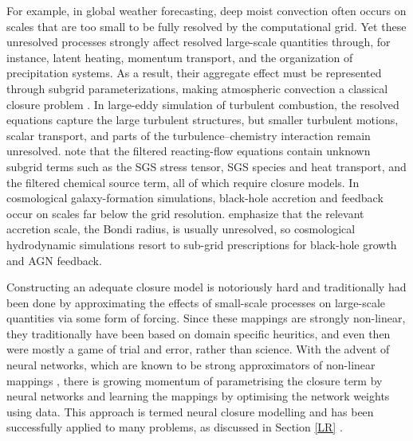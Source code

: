 For example, in global weather forecasting, deep moist convection often occurs on scales that are too small to be fully resolved by the computational grid. Yet these unresolved processes strongly affect resolved large-scale quantities through, for instance, latent heating, momentum transport, and the organization of precipitation systems. As a result, their aggregate effect must be represented through subgrid parameterizations, making atmospheric convection a classical closure problem \cite{wedi2020baseline}. In large-eddy simulation of turbulent combustion, the resolved equations capture the large turbulent structures, but smaller turbulent motions, scalar transport, and parts of the turbulence–chemistry interaction remain unresolved. \citet{janicka2005large} note that the filtered reacting-flow equations contain unknown subgrid terms such as the SGS stress tensor, SGS species and heat transport, and the filtered chemical source term, all of which require closure models. In cosmological galaxy-formation simulations, black-hole accretion and feedback occur on scales far below the grid resolution. \citet{negri2017black} emphasize that the relevant accretion scale, the Bondi radius, is usually unresolved, so cosmological hydrodynamic simulations resort to sub-grid prescriptions for black-hole growth and AGN feedback.

Constructing an adequate closure model is notoriously hard and traditionally had been done by approximating the effects of small-scale processes on large-scale quantities via some form of forcing. Since these mappings are strongly non-linear, they traditionally have been based on domain specific heuritics, and even then were mostly a game of trial and error, rather than science. With the advent of neural networks, which are known to be strong approximators of non-linear mappings \cite{hornik1989multilayer}, there is growing momentum of parametrising the closure term by neural networks and learning the mappings by optimising the network weights using data. This approach is termed neural closure modelling and has been successfully applied to many problems, as discussed in Section \ref{LR} \cite{Gupta2021}.

